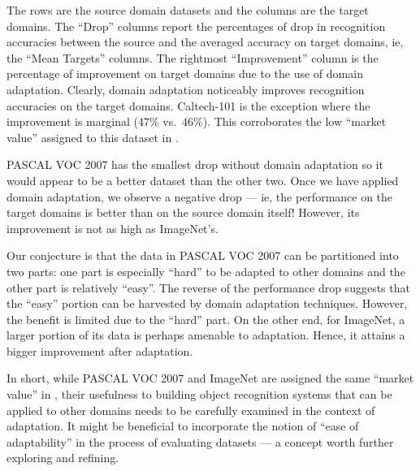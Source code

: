 {The rows are the source domain datasets and the columns are the target domains. The ``Drop'' columns report the percentages of drop in recognition accuracies between the source and the averaged accuracy on target domains, ie, the ``Mean Targets'' columns.  The rightmost ``Improvement'' column is  the percentage of improvement on target domains due to the use of domain adaptation. Clearly, domain adaptation noticeably improves recognition accuracies on the target domains. Caltech-101 is the exception where  the improvement is marginal (47\% vs.~46\%). This corroborates the low ``market value'' assigned to this dataset in \cite{TorralbaCVPR11Unbiased}.

PASCAL VOC 2007 has the smallest drop without domain adaptation so it would appear to be a better dataset than the other two.
Once we have applied domain adaptation, we observe a negative drop --- ie, the performance on the target domains is better than on the source domain itself! However, its improvement is not as high as ImageNet's.

Our conjecture is that  the data in PASCAL VOC 2007 can be partitioned into two parts: one part is especially ``hard'' to be adapted to other domains and the other part is relatively ``easy''. The reverse of the performance drop suggests that the ``easy'' portion can be harvested by domain adaptation techniques. However, the benefit is limited due to the ``hard'' part. On the other end, for ImageNet, a larger portion of its data is perhaps amenable to adaptation. Hence, it attains a bigger improvement after adaptation.

In short, while PASCAL VOC 2007 and ImageNet are assigned the same ``market value'' in \cite{TorralbaCVPR11Unbiased}, their usefulness to building object recognition systems that can be applied to  other domains needs to be carefully examined in the context of adaptation. It might be beneficial to incorporate the notion of ``ease of adaptability'' in the process of evaluating datasets --- a concept worth further exploring and refining.

}



